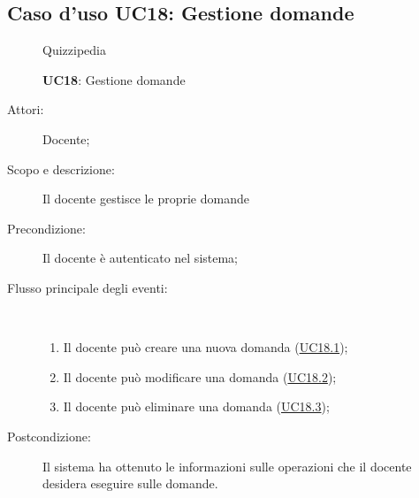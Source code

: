\subsection{Caso d'uso UC18: Gestione domande}
\begin{figure}[H]
	\centering
	\begin{resizedtikzpicture}{\textwidth}
		\begin{umlsystem}[x=0, fill=lightgray!20]{Quizzipedia}
		\end{umlsystem}
	\end{resizedtikzpicture}
	\caption{\textbf{UC18}: Gestione domande}
	\label{UC18}
\end{figure}
\begin{description}
	\item[Attori:] Docente;
	\item[Scopo e descrizione:] Il docente gestisce le proprie domande
	\item[Precondizione:] Il docente è autenticato nel sistema;
	
	\item[Flusso principale degli eventi:] \ 
	\begin{enumerate}
		\item Il docente può creare una nuova domanda (\hyperlink{UC18.1}{UC18.1});
		\item Il docente può modificare una domanda (\hyperlink{UC18.2}{UC18.2});
		\item Il docente può eliminare una domanda (\hyperlink{UC18.3}{UC18.3});
		
	\end{enumerate}
	\item[Postcondizione:] Il sistema ha ottenuto le informazioni sulle operazioni che il docente desidera eseguire sulle domande.
\end{description}
\hypertarget{UC18.1}{}
